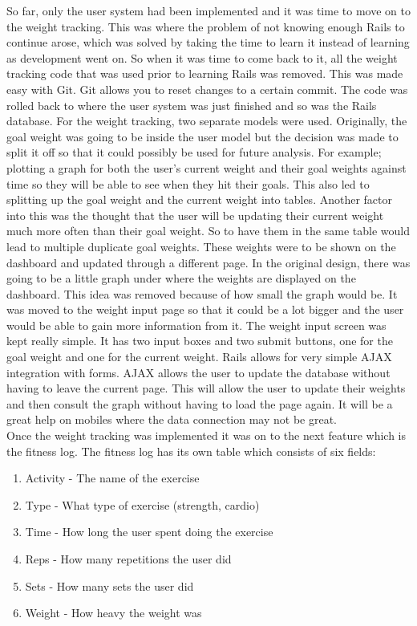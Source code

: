 So far, only the user system had been implemented and it was time to move on to the weight tracking. This was where the problem of not knowing enough Rails to continue arose, which was solved by taking the time to learn it instead of learning as development went on. So when it was time to come back to it, all the weight tracking code that was used prior to learning Rails was removed. This was made easy with Git. Git allows you to reset changes to a certain commit. The code was rolled back to where the user system was just finished and so was the Rails database. For the weight tracking, two separate models were used. Originally, the goal weight was going to be inside the user model but the decision was made to split it off so that it could possibly be used for future analysis. For example; plotting a graph for both the user's current weight and their goal weights against time so they will be able to see when they hit their goals. This also led to splitting up the goal weight and the current weight into tables. Another factor into this was the thought that the user will be updating their current weight much more often than their goal weight. So to have them in the same table would lead to multiple duplicate goal weights. These weights were to be shown on the dashboard and updated through a different page. In the original design, there was going to be a little graph under where the weights are displayed on the dashboard. This idea was removed because of how small the graph would be. It was moved to the weight input page so that it could be a lot bigger and the user would be able to gain more information from it. The weight input screen was kept really simple. It has two input boxes and two submit buttons, one for the goal weight and one for the current weight. Rails allows for very simple AJAX  integration with forms. AJAX allows the user to update the database without having to leave the current page. This will allow the user to update their weights and then consult the graph without having to load the page again. It will be a great help on mobiles where the data connection may not be great.\\

Once the weight tracking was implemented it was on to the next feature which is the fitness log. The fitness log has its own table which consists of six fields:

\begin{enumerate}
\item Activity - The name of the exercise
\item Type - What type of exercise (strength, cardio)
\item Time - How long the user spent doing the exercise
\item Reps - How many repetitions the user did
\item Sets - How many sets the user did
\item Weight - How heavy the weight was
\end{enumerate}

